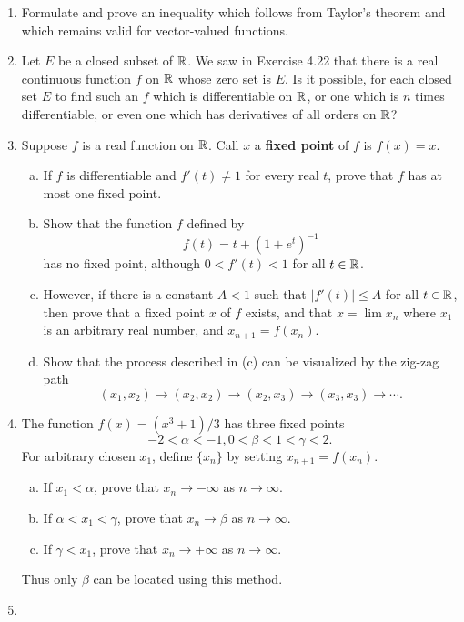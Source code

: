 \begin{enumerate}[1.]
\item %
    Formulate and prove an inequality which follows from Taylor's theorem and which remains valid for vector-valued functions.
\item %
    Let $E$ be a closed subset of $\mathbb{R}$. We saw in Exercise 4.22 that there is a real continuous function $f$ on $\mathbb{R}$ whose zero set is $E$. Is it possible, for each closed set $E$ to find such an $f$ which is differentiable on $\mathbb{R}$, or one which is $n$ times differentiable, or even one which has derivatives of all orders on $\mathbb{R}$?
\item %
    Suppose $f$ is a real function on $\mathbb{R}$. Call $x$ a \textbf{fixed point} of $f$ is $f(x) = x$. 
    \begin{enumerate}[(a)]
    \item If $f$ is differentiable and $f'(t) \ne 1$ for every real $t$, prove that $f$ has at most one fixed point.
    \item Show that the function $f$ defined by
        \[
            f(t) = t + (1 + e^t)^{-1}
        \]
        has no fixed point, although $0 < f'(t) < 1$ for all $t \in \mathbb{R}$.
    \item However, if there is a constant $A < 1$ such that $|f'(t)| \le A$ for all $t \in \mathbb{R}$, then prove that a fixed point $x$ of $f$ exists, and that $x = \lim x_n$ where $x_1$ is an arbitrary real number, and $x_{n+1} = f(x_n)$.
    \item Show that the process described in (c) can be visualized by the zig-zag path
        \[
            (x_1, x_2) \to (x_2, x_2) \to (x_2, x_3) \to (x_3, x_3) \to \dotsb.
        \]
    \end{enumerate}
\item %
    The function $f(x) = (x^3 + 1)/3$ has three fixed points
    \[
        -2 < \alpha < -1, 0 < \beta < 1 < \gamma < 2.
    \]
    For arbitrary chosen $x_1$, define $\{x_n\}$ by setting $x_{n+1} = f(x_n)$.
    \begin{enumerate}[(a)] 
    \item If $x_1 < \alpha$, prove that $x_n \to -\infty$ as $n \to \infty$.
    \item If $\alpha < x_1 < \gamma$, prove that $x_n \to \beta$ as $n \to \infty$.
    \item If $\gamma < x_1$, prove that $x_n \to +\infty$ as $n \to \infty$.
    \end{enumerate}
    Thus only $\beta$ can be located using this method.
\item %

\end{enumerate}
